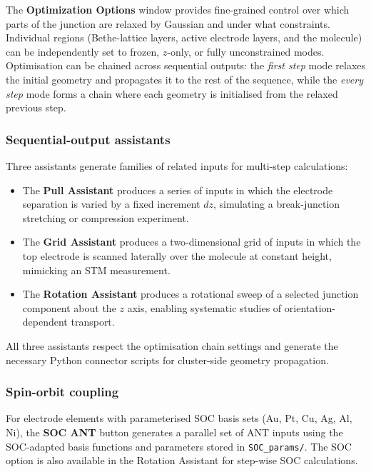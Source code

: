 \documentclass[preprint,12pt, a4paper]{elsarticle}
\begin{document}
The \textbf{Optimization Options} window provides fine-grained control over which parts of the junction are relaxed by Gaussian and under what constraints. Individual regions (Bethe-lattice layers, active electrode layers, and the molecule) can be independently set to frozen, $z$-only, or fully unconstrained modes. Optimisation can be chained across sequential outputs: the \emph{first step} mode relaxes the initial geometry and propagates it to the rest of the sequence, while the \emph{every step} mode forms a chain where each geometry is initialised from the relaxed previous step.

\subsubsection*{Sequential-output assistants}

Three assistants generate families of related inputs for multi-step calculations:

\begin{itemize}
    \item The \textbf{Pull Assistant} produces a series of inputs in which the electrode separation is varied by a fixed increment $dz$, simulating a break-junction stretching or compression experiment.
    \item The \textbf{Grid Assistant} produces a two-dimensional grid of inputs in which the top electrode is scanned laterally over the molecule at constant height, mimicking an STM measurement.
    \item The \textbf{Rotation Assistant} produces a rotational sweep of a selected junction component about the $z$ axis, enabling systematic studies of orientation-dependent transport.
\end{itemize}

All three assistants respect the optimisation chain settings and generate the necessary Python connector scripts for cluster-side geometry propagation.

\subsubsection*{Spin-orbit coupling}

For electrode elements with parameterised SOC basis sets (Au, Pt, Cu, Ag, Al, Ni), the \textbf{SOC ANT} button generates a parallel set of ANT inputs using the SOC-adapted basis functions and parameters stored in \texttt{SOC\_params/}. The SOC option is also available in the Rotation Assistant for step-wise SOC calculations.
\end{document}
